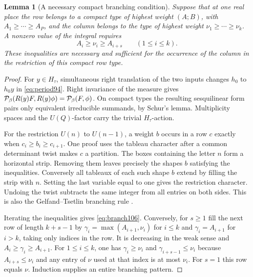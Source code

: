 \documentclass[a4paper,11pt]{article}
\newtheorem{lemma}[proposition]{Lemma}
\theoremstyle{definition}
\theoremstyle{remark}
\numberwithin{equation}{section}
\begin{document}
\begin{lemma}[A necessary compact branching condition]\label{lem:branch106}
Suppose that at one real place the row belongs to a compact type
of highest weight \((A;B)\), with \(A_1\ge\cdots\ge A_P\), and
the column belongs to the type of highest weight
\(\nu_1\ge\cdots\ge\nu_k\). A nonzero value of the integral
requires
\begin{equation}
             A_i\ge\nu_i\ge A_{i+s}\qquad(1\le i\le k).
             \label{eq:branch106}
\end{equation}
These inequalities are necessary and sufficient for the occurrence
of the column in the restriction of this compact row type.
\end{lemma}
\begin{proof}
For \(y\in H_\tau\), simultaneous right translation of the two
inputs changes \(h_0\) to \(h_0y\) in \eqref{eq:period94}.
Right invariance of the measure gives
\({\cal P}_\beta(R(y)F,R(y)\phi)={\cal P}_\beta(F,\phi)\).
On compact types the resulting sesquilinear form pairs only
equivalent irreducible summands, by Schur's lemma. Multiplicity
spaces and the \(U(Q)\)-factor carry the trivial \(H_\tau\)-action.

For the restriction \(U(n)\) to \(U(n-1)\), a weight \(b\)
occurs in a row \(c\) exactly when \(c_i\ge b_i\ge c_{i+1}\).
One proof uses the tableau character after a common determinant
twist makes \(c\) a partition. The boxes containing the letter
\(n\) form a horizontal strip. Removing them leaves precisely
the shapes \(b\) satisfying the inequalities. Conversely all
tableaux of each such shape \(b\) extend by filling the strip
with \(n\). Setting the last variable equal to one gives the
restriction character. Undoing the twist subtracts the same
integer from all entries on both sides. This is also the
Gelfand--Tsetlin branching rule \cite[Theorem 2.1]{XVII-XII-IV-molev106}.

Iterating the inequalities gives \eqref{eq:branch106}. Conversely,
for \(s\ge1\) fill the next row of length \(k+s-1\) by
\(\gamma_i=\max(A_{i+1},\nu_i)\) for \(i\le k\) and
\(\gamma_i=A_{i+1}\) for \(i>k\), taking only indices in the row.
It is decreasing in the weak sense and \(A_i\ge\gamma_i\ge A_{i+1}\).
For \(1\le i\le k\), one has \(\gamma_i\ge\nu_i\) and
\(\gamma_{i+s-1}\le\nu_i\) because \(A_{i+s}\le\nu_i\) and any
entry of \(\nu\) used at that index is at most \(\nu_i\).
For \(s=1\) this row equals \(\nu\). Induction supplies an entire
branching pattern.
\end{proof}
\end{document}

